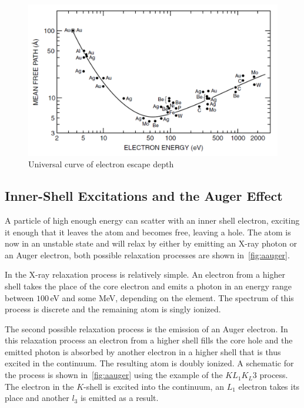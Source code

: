 \documentclass[a4paper,10pt]{scrartcl}
\begin{document}
\begin{figure}
\centering
\includegraphics[scale=0.4]{img/ucurve}
\caption{Universal curve of electron escape depth \label{fig:ucurve}}
\end{figure}

\subsection{Inner-Shell Excitations and the Auger Effect}

A particle of high enough energy can scatter with an inner shell electron, exciting it enough that it leaves the atom and becomes free, leaving a hole. The atom is now in an unstable state and will relax by either by emitting an X-ray photon or an Auger electron, both possible relaxation processes are shown in~\ref{fig:aauger}.

In the X-ray relaxation process is relatively simple. An electron from a higher shell takes the place of the core electron and emits a photon in an energy range between $100\,$eV and some MeV, depending on the element. The spectrum of this process is discrete and the remaining atom is singly ionized.

The second possible relaxation process is the emission of an Auger electron. In this relaxation process an electron from a higher shell fills the core hole and the emitted photon is absorbed by another electron in a higher shell that is thus excited in the continuum. The resulting atom is doubly ionized. A schematic for the process is shown in~\ref{fig:aauger} using the example of the $KL_{1}K_L{3}$ process. The electron in the $K$-shell is excited into the continuum, an $L_1$ electron takes its place and another $l_3$ is emitted as a result.
\end{document}
